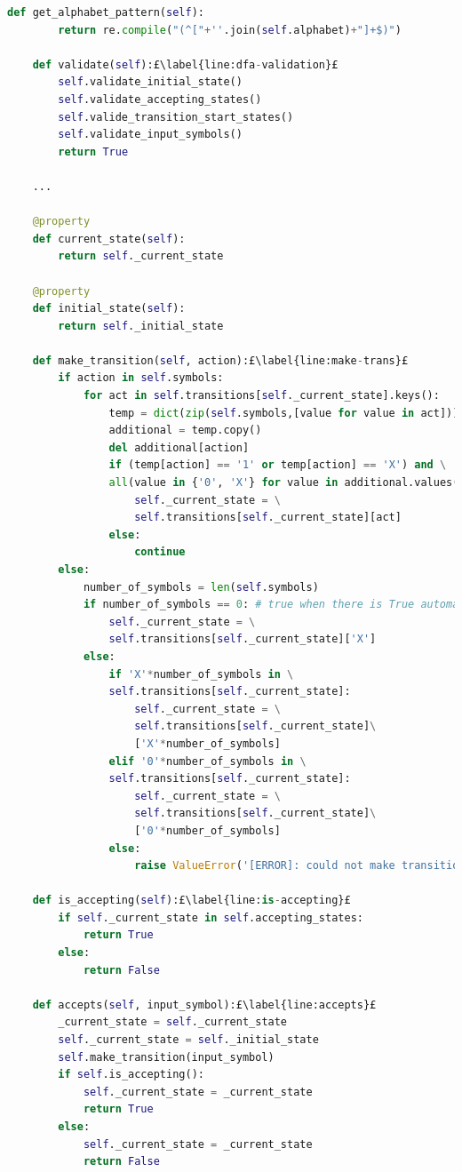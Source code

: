\begin{lstlisting}[language=Python, style=Python, escapechar = £, label={code:janus-automa}, caption={The \texttt{automa.py} module}]
    def get_alphabet_pattern(self):
        return re.compile("(^["+''.join(self.alphabet)+"]+$)")

    def validate(self):£\label{line:dfa-validation}£
        self.validate_initial_state()
        self.validate_accepting_states()
        self.valide_transition_start_states()
        self.validate_input_symbols()
        return True

    ...

    @property
    def current_state(self):
        return self._current_state

    @property
    def initial_state(self):
        return self._initial_state

    def make_transition(self, action):£\label{line:make-trans}£
        if action in self.symbols:
            for act in self.transitions[self._current_state].keys():
                temp = dict(zip(self.symbols,[value for value in act]))
                additional = temp.copy()
                del additional[action]
                if (temp[action] == '1' or temp[action] == 'X') and \
                all(value in {'0', 'X'} for value in additional.values()):
                    self._current_state = \
                    self.transitions[self._current_state][act]
                else:
                    continue
        else:
            number_of_symbols = len(self.symbols)
            if number_of_symbols == 0: # true when there is True automa
                self._current_state = \
                self.transitions[self._current_state]['X']
            else:
                if 'X'*number_of_symbols in \
                self.transitions[self._current_state]:
                    self._current_state = \
                    self.transitions[self._current_state]\
                    ['X'*number_of_symbols]
                elif '0'*number_of_symbols in \
                self.transitions[self._current_state]:
                    self._current_state = \
                    self.transitions[self._current_state]\
                    ['0'*number_of_symbols]
                else:
                    raise ValueError('[ERROR]: could not make transition')

    def is_accepting(self):£\label{line:is-accepting}£
        if self._current_state in self.accepting_states:
            return True
        else:
            return False

    def accepts(self, input_symbol):£\label{line:accepts}£
        _current_state = self._current_state
        self._current_state = self._initial_state
        self.make_transition(input_symbol)
        if self.is_accepting():
            self._current_state = _current_state
            return True
        else:
            self._current_state = _current_state
            return False
\end{lstlisting}
